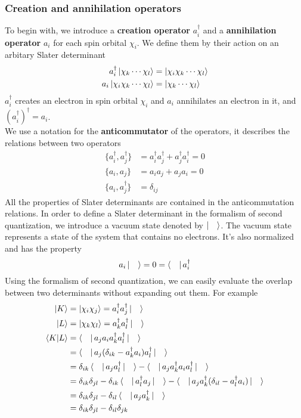 \documentclass[11pt]{article}
\begin{document}
\subsubsection{Creation and annihilation operators}
To begin with, we introduce a \textbf{creation operator} $a_i^\dagger$ and a \textbf{annihilation operator} $a_i$ for each spin orbital $\chi_i$.
We define them by their action on an arbitary Slater determinant
\begin{align}
    a_i^\dagger\ket{\chi_k\cdots\chi_l}&=\ket{\chi_i\chi_k\cdots\chi_l}\\
    a_i\ket{\chi_i\chi_k\cdots\chi_l}&=\ket{\chi_k\cdots\chi_l}
\end{align}
$a_i^\dagger$ creates an electron in spin orbital $\chi_i$ and $a_i$ annihilates an electron in it, and ${(a_i^\dagger)}^\dagger=a_i$.\\
We use a notation for the \textbf{anticommutator} of the operators, it describes the relations between two operators
\begin{align}
    \biggl\{a_i^\dagger,a_j^\dagger\biggr\} &= a_i^\dagger a_j^\dagger+a_j^\dagger a_i^\dagger = 0\\
    \biggl\{a_i,a_j\biggr\} &= a_i a_j+a_j a_i = 0\\
    \biggl\{a_i,a_j^\dagger\biggr\} &=\delta_{ij}
\end{align}
All the properties of Slater determinants are contained in the anticommutation relations. In order to define a Slater determinant in the formalism
of second quantization, we introduce a vacuum state denoted by $\ket{\quad}$. The vacuum state represents a state of the system that contains no
electrons. It's also normalized and has the property
\begin{equation}
    a_i\ket{\quad}=0=\bra{\quad}a_i^\dagger
\end{equation}
Using the formalism of second quantization, we can easily evaluate the overlap between two determinants without expanding out them. For example
\begin{equation}
    \begin{split}
        \ket{K}&=\ket{\chi_i\chi_j}=a_i^\dagger a_j^\dagger\ket{\quad}\\
        \ket{L}&=\ket{\chi_k\chi_l}=a_k^\dagger a_l^\dagger\ket{\quad}\\
        \braket{K|L}&=\bra{\quad}a_j a_i a_k^\dagger a_l^\dagger\ket{\quad}\\
        &=\bra{\quad}a_j(\delta_{ik}-a_k^\dagger a_i)a_l^\dagger\ket{\quad}\\
        &=\delta_{ik}\bra{\quad}a_j a_l^\dagger\ket{\quad}-\bra{\quad}a_j a_k^\dagger a_i a_l^\dagger\ket{\quad}\\
        &=\delta_{ik}\delta_{jl}-\delta_{ik}\bra{\quad}a_l^\dagger a_j\ket{\quad}-\bra{\quad}a_j a_k^\dagger (\delta_{il}-a_l^\dagger a_i)\ket{\quad}\\
        &=\delta_{ik}\delta_{jl}-\delta_{il}\bra{\quad}a_j a_k^\dagger\ket{\quad}\\
        &=\delta_{ik}\delta_{jl}-\delta_{il}\delta_{jk}
    \end{split}
\end{equation}
\end{document}
